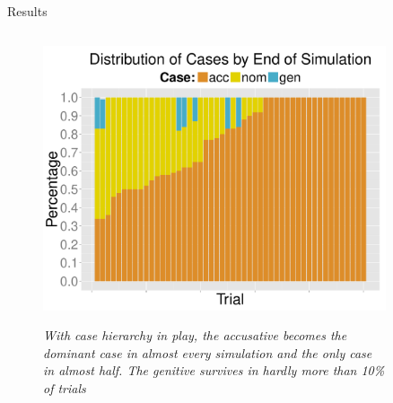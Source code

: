 \documentclass[final]{beamer}
\newlength{\sepwid}
\newlength{\onecolwid}
\newlength{\twocolwid}
\begin{document}
\begin{frame}[t]
\begin{columns}[t]
\begin{column}{\twocolwid}
\begin{block}{Results}
\begin{columns}[t]
\begin{column}{.33\linewidth}
    \begin{figure}
    \begin{center} 
	\vspace{2cm}
	{\centering \includegraphics[width=1\textwidth]{casedistribution.pdf}}
	\end{center}
	 \footnotesize
	\caption{\textit{With case hierarchy in play, the accusative becomes the dominant case in almost every simulation and the only case in almost half. The genitive survives in hardly more than 10\% of trials}}
	\end{figure}
	
    \end{column}
\end{columns}

\end{block}


\end{column} %

\begin{column}{\sepwid}\end{column} %

\begin{column}{\onecolwid} %



\end{column}
\end{columns}
\end{frame}
\end{document}
